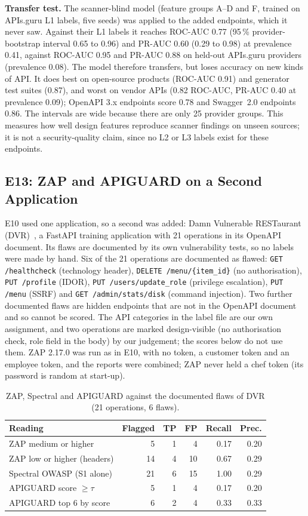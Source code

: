 \documentclass[conference]{IEEEtran}
\begin{document}
\textbf{Transfer test.} The scanner-blind model (feature groups A--D and F, trained on APIs.guru L1 labels, five seeds) was applied to the added endpoints, which it never saw. Against their L1 labels it reaches ROC-AUC 0.77 (95\,\% provider-bootstrap interval 0.65 to 0.96) and PR-AUC 0.60 (0.29 to 0.98) at prevalence 0.41,
against ROC-AUC 0.95 and PR-AUC 0.88 on held-out APIs.guru providers (prevalence 0.08). The model therefore transfers, but loses accuracy on new kinds of API. It does best on open-source products (ROC-AUC 0.91) and generator test suites (0.87),
and worst on vendor APIs (0.82 ROC-AUC, PR-AUC 0.40 at prevalence 0.09); OpenAPI 3.x endpoints score 0.78 and Swagger~2.0 endpoints 0.86. The intervals are wide because there are only 25 provider groups. This measures how well design features reproduce scanner findings on unseen sources; it is not a security-quality claim, since no L2 or L3 labels exist for these endpoints.

\subsection{E13: ZAP and APIGUARD on a Second Application}
\label{sec:e13}
E10 used one application, so a second was added: Damn Vulnerable RESTaurant (DVR)~\cite{dvr}, a FastAPI training application with 21 operations in its OpenAPI document. Its flaws are documented by its own vulnerability tests, so no labels were made by hand.
Six of the 21 operations are documented as flawed: \texttt{GET /healthcheck} (technology header), \texttt{DELETE /menu/\{item\_id\}} (no authorisation), \texttt{PUT /profile} (IDOR), \texttt{PUT /users/update\_role} (privilege escalation), \texttt{PUT /menu} (SSRF) and \texttt{GET /admin/stats/disk} (command injection).
Two further documented flaws are hidden endpoints that are not in the OpenAPI document and so cannot be scored. The API categories in the label file are our own assignment, and two operations are marked design-visible (no authorisation check, role field in the body) by our judgement; the scores below do not use them.
ZAP 2.17.0 was run as in E10, with no token, a customer token and an employee token, and the reports were combined; ZAP never held a chef token (its password is random at start-up).

\begin{table}[!t]
\caption{ZAP, Spectral and APIGUARD against the documented flaws of DVR (21 operations, 6 flaws).}
\label{tab:e13}
\centering
\footnotesize
\begin{tabular}{lrrrrr}
\toprule
\textbf{Reading} & \textbf{Flagged} & \textbf{TP} & \textbf{FP} & \textbf{Recall} & \textbf{Prec.}\\
\midrule
ZAP medium or higher & 5 & 1 & 4 & 0.17 & 0.20\\
ZAP low or higher (headers) & 14 & 4 & 10 & 0.67 & 0.29\\
Spectral OWASP (S1 alone) & 21 & 6 & 15 & 1.00 & 0.29\\
APIGUARD score $\geq\tau$ & 5 & 1 & 4 & 0.17 & 0.20\\
APIGUARD top 6 by score & 6 & 2 & 4 & 0.33 & 0.33\\
\bottomrule
\end{tabular}
\end{table}
\end{document}
